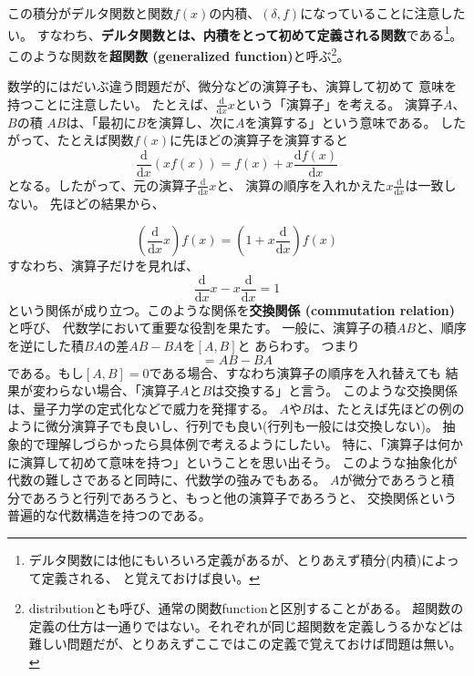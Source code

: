 \documentclass{jarticle}
\newcommand{\diff}{\mathrm d}
\begin{document}
この積分がデルタ関数と関数$f(x)$の内積、$(\delta,f)$になっていることに注意したい。
すなわち、{\bf デルタ関数とは、内積をとって初めて定義される関数}である\footnote{%
  デルタ関数には他にもいろいろ定義があるが、とりあえず積分(内積)によって定義される、
  と覚えておけば良い。
}。
このような関数を{\bf 超関数 (generalized function)}と呼ぶ\footnote{%
  distributionとも呼び、通常の関数functionと区別することがある。
  超関数の定義の仕方は一通りではない。それぞれが同じ超関数を定義しうるかなどは
  難しい問題だが、とりあえずここではこの定義で覚えておけば問題は無い。
}。

数学的にはだいぶ違う問題だが、微分などの演算子も、演算して初めて
意味を持つことに注意したい。
たとえば、$\displaystyle \frac{\diff}{\diff x} x$という「演算子」を考える。
演算子$A$、$B$の積 $AB$は、「最初に$B$を演算し、次に$A$を演算する」という意味である。
したがって、たとえば関数$f(x)$に先ほどの演算子を演算すると
\begin{equation}
  \frac{\diff}{\diff x} (x f(x)) = f(x) + x \frac{\diff f(x)}{\diff x}
\end{equation}
となる。したがって、元の演算子$\displaystyle \frac{\diff}{\diff x} x$と、
演算の順序を入れかえた$\displaystyle x \frac{\diff}{\diff x}$は一致しない。
先ほどの結果から、

\begin{equation}
  (\frac{\diff}{\diff x} x) f(x)  =  (1 + x \frac{\diff }{\diff x}) f(x)
\end{equation}
すなわち、演算子だけを見れば、
\begin{equation}
  \frac{\diff}{\diff x} x -   x \frac{\diff }{\diff x} =  1
\end{equation}
という関係が成り立つ。このような関係を{\bf 交換関係 (commutation relation)}と呼び、
代数学において重要な役割を果たす。
一般に、演算子の積$AB$と、順序を逆にした積$BA$の差$AB-BA$を$[A,B]$と
あらわす。
つまり
\begin{equation}
  [A,B] = AB - BA
\end{equation}
である。もし$[A,B]=0$である場合、すなわち演算子の順序を入れ替えても
結果が変わらない場合、「演算子$A$と$B$は交換する」と言う。
このような交換関係は、量子力学の定式化などで威力を発揮する。
$A$や$B$は、たとえば先ほどの例のように微分演算子でも良いし、行列でも良い(行列も一般には交換しない)。
抽象的で理解しづらかったら具体例で考えるようにしたい。
特に、「演算子は何かに演算して初めて意味を持つ」ということを思い出そう。
このような抽象化が代数の難しさであると同時に、代数学の強みでもある。
$A$が微分であろうと積分であろうと行列であろうと、もっと他の演算子であろうと、
交換関係という普遍的な代数構造を持つのである。
\end{document}
